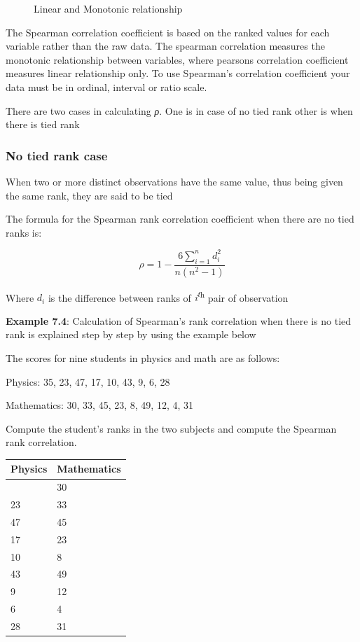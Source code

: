 \documentclass[
]{book}
\begin{document}
\begin{figure}
{}

\caption{Linear and Monotonic relationship}\label{fig:c6}
\end{figure}

The Spearman correlation coefficient is based on the ranked values for
each variable rather than the raw data. The spearman correlation
measures the monotonic relationship between variables, where pearsons
correlation coefficient measures linear relationship only. To use
Spearman's correlation coefficient your data must be in ordinal,
interval or ratio scale.

There are two cases in calculating \emph{ρ}. One is in case of no tied rank
other is when there is tied rank

\subsubsection{No tied rank case}\label{no-tied-rank-case}

When two or more distinct observations have the same value, thus being
given the same rank, they are said to be tied

The formula for the Spearman rank correlation coefficient when there are
no tied ranks is:

\[\rho = 1 - \frac{6\sum_{i = 1}^{n}d_{i}^{2}}{n\left( n^{2} - 1 \right)}\]

Where \(d_{i}\) is the difference between ranks of \emph{i\textsuperscript{t}}\textsuperscript{h} pair of
observation

\textbf{Example 7.4}: Calculation of Spearman's rank correlation when there
is no tied rank is explained step by step by using the example below

The scores for nine students in physics and math are as follows:

Physics: 35, 23, 47, 17, 10, 43, 9, 6, 28

Mathematics: 30, 33, 45, 23, 8, 49, 12, 4, 31

Compute the student's ranks in the two subjects and compute the Spearman
rank correlation.

\begin{longtable}[]{@{}ll@{}}
\toprule\noalign{}
Physics & Mathematics \\
\midrule\noalign{}
\endhead
\bottomrule\noalign{}
\endlastfoot
35 & 30 \\
23 & 33 \\
47 & 45 \\
17 & 23 \\
10 & 8 \\
43 & 49 \\
9 & 12 \\
6 & 4 \\
28 & 31 \\
\end{longtable}
\end{document}
